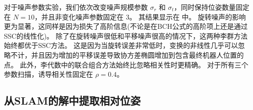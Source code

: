 对于噪声参数实验，我们依次改变噪声规模参数 $\sigma_r$ 和 $\sigma_t$，同时保持位姿数量固定在 $N=10$，并且非变化噪声参数固定在 $3$。 
其结果显示在  中。 
旋转噪声的影响更为显著，这同样是因为损失了高阶信息(不论是在BCH公式的高阶项上还是通过SSC的线性化)。 
除了在旋转噪声很低和平移噪声很高的情况下，这两种李群方法始终都优于SSC方法。 
这是因为当旋转误差非常低时，变换的非线性几乎可以忽略不计，并且因为增加的平移误差导致协方差椭圆增加到包含最终机器人位置的点。 
此外，李代数中的联合组合方法始终比忽略相关性时更精确。 
对于所有三个参数扫描，诱导相关性固定在 $\rho=0.4$。 

\subsection{从SLAM的解中提取相对位姿}
\label{sec:eval:relative}

\begin{table}[t!]
  \addtolength{\tabcolsep}{-5pt}
  \centering
  \caption{从 Manhattan3500 数据集合 \cite{olson2006fast} 的解中提取的总共44425个位姿对，对于所提议的方法和 SSC \cite{smith1990a} 的相对位姿估计的标准化协方差误差统计摘要，位姿偏移范围为5到500个节点。}
  \label{table:norm_cov_error}
\end{table}


